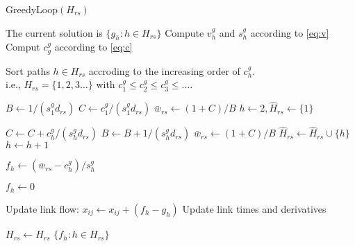 \begin{algorithm}
\caption{GreedyLoop$(H_{rs})$}
\label{greedy-loop}
\begin{algorithmic}[1]

\STATE The current solution is $\{g_h: h\in H_{rs}\}$
	\STATE Compute $v_h^g$ and $s_h^g$ according to \eqref{eq:v}
	\STATE Comput $c_g^g$ according to \eqref{eq:c}
\ENDFOR

\STATE Sort paths $h\in H_{rs}$ accroding to the increasing
order of $c_h^g$.\\i.e., $H_{rs} = \{1,2,3\ldots\}$ with
$c_1^g\leq c_2^g\leq c_3^g\leq \ldots$.

\STATE $B\leftarrow 1/(s_1^g d_{rs})$
\STATE $C\leftarrow c_1^g/(s_1^g d_{rs})$
\STATE $\bar{w}_{rs}\leftarrow (1+C)/B$
\STATE $h\leftarrow 2, \hat{H}_{rs}\leftarrow \{1\}$

	\STATE $C\leftarrow C + c_h^g/(s_h^g d_{rs})$
	\STATE $B\leftarrow B + 1/(s_h^g d_{rs})$
	\STATE $\bar{w}_{rs}\leftarrow (1+C)/B$
	\STATE $\hat{H}_{rs}\leftarrow \hat{H}_{rs}\cup \{h\}$
	\STATE $h\leftarrow h+1$
\ENDWHILE

	\STATE $f_h\leftarrow (\bar{w}_{rs} - c_h^g)/s_h^g$
\ENDFOR

	\STATE $f_h\leftarrow 0$
\ENDFOR

		\STATE Update link flow: $x_{ij}\leftarrow x_{ij}+(f_h-g_h)$
		\STATE Update link times and derivatives
	\ENDIF
\ENDFOR

\STATE $H_{rs}\leftarrow \hat{H}_{rs}$
\RETURN $\{f_h: h\in H_{rs}\}$
\end{algorithmic}
\end{algorithm}
